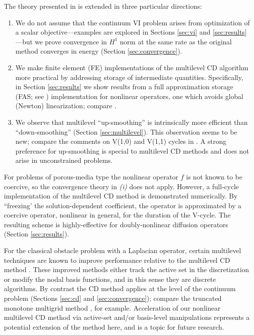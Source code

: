 \documentclass[letterpaper,final,12pt,reqno]{amsart}
\theoremstyle{cstyle}
\theoremstyle{cstyle*}
\theoremstyle{dstyle}
\numberwithin{equation}{section}
\numberwithin{figure}{section}
\numberwithin{table}{section}
\numberwithin{theorem}{section}
\begin{document}
The theory presented in \cite{Tai2003} is extended in three particular directions:
\renewcommand{\labelenumi}{\emph{(\roman{enumi})}}
\begin{enumerate}
\item We do not assume that the continuum VI problem arises from optimization of a scalar objective---examples are explored in Sections \ref{sec:vi} and \ref{sec:results}---but we prove convergence in $H^1$ norm at the same rate as the original method converges in energy (Section \ref{sec:convergence}). %

\item We make finite element (FE) implementations of the multilevel CD algorithm more practical by addressing storage of intermediate quantities.  Specifically, in Section \ref{sec:results} we show results from a full approximation storage (FAS; see \cite{Brandt1977,Bruneetal2015}) implementation for nonlinear operators, one which avoids global (Newton) linearization; compare \cite{GraeserKornhuber2009}.

\item We observe that multilevel ``up-smoothing'' is intrinsically more efficient than ``down-smoothing'' (Section \ref{sec:multilevel}).  This observation seems to be new; compare the comments on V(1,0) and V(1,1) cycles in \cite{GraeserKornhuber2009,Tai2003}.  A strong preference for up-smoothing is special to multilevel CD methods and does not arise in unconstrained problems.
\end{enumerate}

For problems of porous-media type the nonlinear operator $f$ is not known to be coercive, so the convergence theory in \emph{(i)} does not apply.  However, a full-cycle implementation of the multilevel CD method is demonstrated numerically.  By ``freezing' the solution-dependent coefficient, the operator is approximated by a coercive operator, nonlinear in general, for the duration of the V-cycle.  The resulting scheme is highly-effective for doubly-nonlinear diffusion operators (Section \ref{sec:results}).

For the classical obstacle problem with a Laplacian operator, certain multilevel techniques are known to improve performance relative to the multilevel CD method \cite{GraeserKornhuber2009}.  These improved methods either track the active set in the discretization or modify the nodal basis functions, and in this sense they are discrete algorithms.  By contrast the CD method applies at the level of the continuum problem (Sections \ref{sec:cd} and \ref{sec:convergence}); compare the truncated monotone multigrid method \cite{Kornhuber1994}, for example.  Acceleration of our nonlinear multilevel CD method via active-set and/or basis-level manipulations represents a potential extension of the method here, and is a topic for future research.
\end{document}
